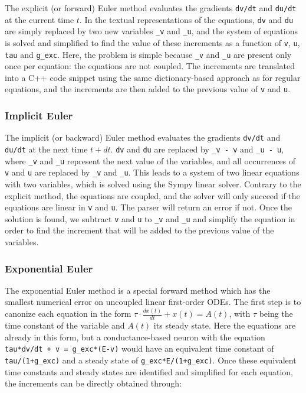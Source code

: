 \documentclass[
  11pt,
  a4paper,
]{scrbook}
\begin{document}
The explicit (or forward) Euler method evaluates the gradients
\texttt{dv/dt} and \texttt{du/dt} at the current time \(t\). In the
textual representations of the equations, \texttt{dv} and \texttt{du}
are simply replaced by two new variables \texttt{\_v} and \texttt{\_u},
and the system of equations is solved and simplified to find the value
of these increments as a function of \texttt{v}, \texttt{u},
\texttt{tau} and \texttt{g\_exc}. Here, the problem is simple because
\texttt{\_v} and \texttt{\_u} are present only once per equation: the
equations are not coupled. The increments are translated into a C++ code
snippet using the same dictionary-based approach as for regular
equations, and the increments are then added to the previous value of
\texttt{v} and \texttt{u}.

\subsubsection*{Implicit Euler}\label{implicit-euler}

The implicit (or backward) Euler method evaluates the gradients
\texttt{dv/dt} and \texttt{du/dt} at the next time \(t+dt\). \texttt{dv}
and \texttt{du} are replaced by \texttt{\_v\ -\ v} and
\texttt{\_u\ -\ u}, where \texttt{\_v} and \texttt{\_u} represent the
next value of the variables, and all occurrences of \texttt{v} and
\texttt{u} are replaced by \texttt{\_v} and \texttt{\_u}. This leads to
a system of two linear equations with two variables, which is solved
using the Sympy linear solver. Contrary to the explicit method, the
equations are coupled, and the solver will only succeed if the equations
are linear in \texttt{v} and \texttt{u}. The parser will return an error
if not. Once the solution is found, we subtract \texttt{v} and
\texttt{u} to \texttt{\_v} and \texttt{\_u} and simplify the equation in
order to find the increment that will be added to the previous value of
the variables.

\subsubsection*{Exponential Euler}\label{exponential-euler}

The exponential Euler method is a special forward method which has the
smallest numerical error on uncoupled linear first-order ODEs. The first
step is to canonize each equation in the form
\(\tau \cdot \frac{dx(t)}{dt} + x(t) = A(t)\), with \(\tau\) being the
time constant of the variable and \(A(t)\) its steady state. Here the
equations are already in this form, but a conductance-based neuron with
the equation \texttt{tau*dv/dt\ +\ v\ =\ g\_exc*(E-v)} would have an
equivalent time constant of \texttt{tau/(1+g\_exc)} and a steady state
of \texttt{g\_exc*E/(1+g\_exc)}. Once these equivalent time constants
and steady states are identified and simplified for each equation, the
increments can be directly obtained through:
\end{document}
